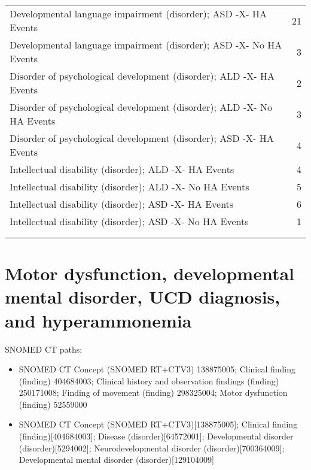 \documentclass[10pt, letterpaper]{article}
\begin{document}
\begin{spacing}{1.0}
\begin{small}
\begin{longtable}[H]{p{5in}r}
        Developmental language impairment (disorder); ASD -X- HA Events & 21 \\
        \rowcolor{ltBlue}
        Developmental language impairment (disorder); ASD -X- No HA Events & 3 \\
        Disorder of psychological development (disorder); ALD -X- HA Events & 2 \\
        \rowcolor{ltBlue}
        Disorder of psychological development (disorder); ALD -X- No HA Events & 3 \\
        Disorder of psychological development (disorder); ASD -X- HA Events & 4 \\
        \rowcolor{ltBlue}
        Intellectual disability (disorder); ALD -X- HA Events & 4 \\
        Intellectual disability (disorder); ALD -X- No HA Events & 5 \\
        \rowcolor{ltBlue}
        Intellectual disability (disorder); ASD -X- HA Events & 6 \\
        Intellectual disability (disorder); ASD -X- No HA Events & 1 \\
        & \\[-4pt]
        \hline
        \label{tab:DMD-Dx-HA-01}
    \end{longtable}
\end{small}

\clearpage

\section{Motor dysfunction, developmental mental disorder, UCD diagnosis, and hyperammonemia}

\vspace{10pt}

SNOMED CT paths:

\small
\begin{itemize}
    \item SNOMED CT Concept (SNOMED RT+CTV3) 138875005; Clinical finding (finding) 404684003; Clinical history and observation findings (finding) 250171008; Finding of movement (finding) 298325004; Motor dysfunction (finding) 52559000
    \item SNOMED CT Concept (SNOMED RT+CTV3)[138875005]; Clinical finding (finding)[404684003]; Disease (disorder)[64572001]; Developmental disorder (disorder)[5294002]; Neurodevelopmental disorder (disorder)[700364009]; Developmental mental disorder (disorder)[129104009]
\end{itemize}
\normalsize


\end{spacing}
\end{document}

